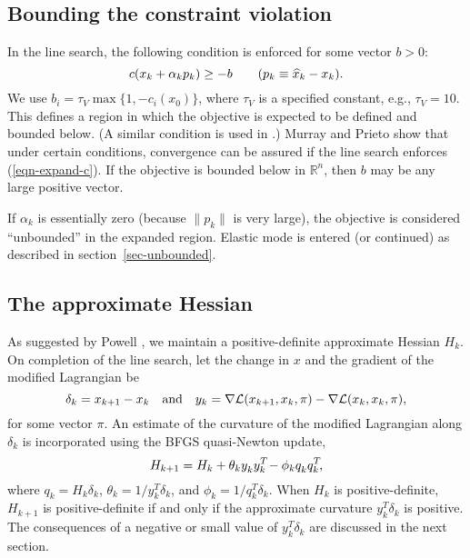 \documentclass[draft,leqno,onefignum,onetabnum]{siamltex}
\def\drop{^{\null}}
\def\grad{\nabla}
\def\kp#1{_{k+#1}}
\def\norm#1{\|#1\|}
\def\Lscr{{\mathcal L}}
\def\T{^T\!}
\def\words#1{\hbox{\quad#1\quad}}
\def\V{_{\scriptscriptstyle V}}
\def\xhat{\skew{2.8}\widehat x}
\def\L {\Lscr}                    %
\begin{document}
 \subsection{Bounding the constraint violation} \label{sec-viol-lim}

In the line search, the following condition is enforced
for some vector $b > 0$:
\begin{equation}                 \label{eqn-expand-c}
        c(x_k +\alpha_k p_k) \ge - b  \qquad (p_k \equiv \xhat_k - x_k).
\end{equation}
We use $b_i = \tau\V \max\{1,-c_i(x_0) \}$, where $\tau\V$ is a
specified constant, e.g., $\tau\V = 10$.  This defines a region in
which the objective is expected to be defined and bounded below.  (A
similar condition is used in \cite{Spe81}.)  Murray and Prieto
\cite{MurP95} show that under certain conditions, convergence can be
assured if the line search enforces (\ref{eqn-expand-c}).  If the
objective is bounded below in $\mathbb R^n$, then $b$ may be any large positive
vector.

If $\alpha_k$ is essentially zero (because $\norm{p_k}$ is very large),
the objective is considered ``unbounded'' in the expanded region.
Elastic mode is entered (or continued) as described in section~\ref{sec-unbounded}.


 \subsection{The approximate Hessian} \label{sec-H}

As suggested by Powell \cite{Pow78a}, we maintain a positive-definite
approximate Hessian $H_k$.  On completion of the line search, let the
change in $x$ and the gradient of the modified Lagrangian be
$$
   \delta_k = x\kp1 - x_k  \words{and}
        y_k = \grad\L(x\kp1,x_k,\pi) - \grad\L(x_k,x_k,\pi),
$$
for some vector $\pi$.  An estimate of the curvature of the modified
Lagrangian along $\delta_k$ is incorporated using the BFGS
quasi-Newton update,
$$
        H\kp1 = H_k + \theta_k y_k\drop y_k\T - \phi_k q_k\drop q_k\T,
$$
where $q_k = H_k \delta_k$, $\theta_k = 1 / y_k\T \delta_k$,
                        and $\phi_k   = 1 / q_k\T \delta_k$.
When $H_k$ is positive-definite, $H\kp1$ is positive-definite if and
only if the approximate curvature $y_k\T\delta_k$ is positive.  The
consequences of a negative or small value of $y_k\T\delta_k$ are
discussed in the next section.
\end{document}
